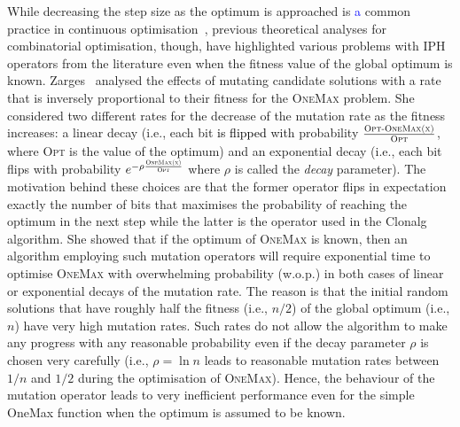 \documentclass[lettersize,journal]{IEEEtran}
\newcommand{\new}[1]{\textcolor{black}{#1}}
\newcommand{\rev}[1]{\textcolor{blue}{#1}}
\begin{document}
While decreasing the step size as the optimum is approached is \rev{a} common practice in continuous optimisation~\cite{AugerDoerrBook}, previous theoretical analyses for combinatorial optimisation, though, have highlighted various problems with IPH operators from the literature even when the fitness value of the global optimum is known.
Zarges~ \cite{Zarges2008} analysed the effects of mutating candidate solutions with a rate that is inversely proportional to their fitness for the \textsc{OneMax} problem.
She considered two different rates for the decrease of the mutation rate as the fitness increases: a linear decay (i.e., each bit \new{is flipped} with probability $\frac{\textsc{{\color{black}\text{Opt}-}OneMax(x)}}{\textsc{Opt}}$, where \textsc{Opt} is the value of the optimum) 
and an exponential decay (i.e., each bit flips with probability $e^{- \rho \frac{\textsc{OneMax(x)}}{\textsc{Opt}}}$ where $\rho$ is called the {\it decay} parameter).
The motivation behind these choices are that the former operator flips in expectation exactly the number of bits that maximises the probability of reaching the optimum in the next step while the latter is the
operator used in the Clonalg algorithm.  
She showed that if the optimum of \textsc{OneMax} is known, then an algorithm employing such mutation operator\new{s} will require exponential time to optimise \textsc{OneMax} with overwhelming probability (w.o.p.)
in both cases of linear or exponential decays of the mutation rate.
The reason is that the initial random solutions that have roughly half the fitness (i.e., $n/2$) of the global optimum (i.e., $n$) have very high mutation rates. Such rates do not allow the algorithm to make any progress with any reasonable probability even if the decay parameter $\rho$ is chosen very carefully (i.e., $\rho = \ln n$ leads to reasonable mutation rates between $1/n$ and $1/2$ during the optimisation of \textsc{OneMax}).
Hence, the behaviour of the mutation operator leads to very inefficient performance even for the simple OneMax function when the optimum is assumed to be known. 
\end{document}
